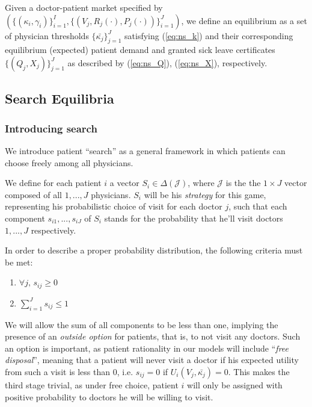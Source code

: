 \documentclass[../main.tex]{subfiles}
\begin{document}
\begin{equilibrium}
    \label{ns_eq}
Given a doctor-patient market specified by \\ $(\{(\kappa_i,\gamma_i)\}_{i =1}^{I},\{(V_j,R_j(\cdot),P_j(\cdot))\}_{i =1}^{J})$, we define an equilibrium as a set of physician thresholds $\{\bar{\kappa_j}\}_{j =1}^{J}$ satisfying (\ref{eq:ns_k}) and their corresponding equilibrium (expected) patient demand and granted sick leave certificates $\{(Q_j,X_j)\}_{j =1}^{J}$ as described by (\ref{eq:ns_Q}), (\ref{eq:ns_X}), respectively.
\end{equilibrium}

\subsection{Search Equilibria}

\subsubsection{Introducing search}

We introduce patient ``search'' as a general framework in which patients can choose freely among all physicians.

We define for each patient $i$ a vector $S_i \in \Delta(\mathcal{J})$, where $\mathcal{J}$ is the the $1 \times J$ vector composed of all $1, ..., J$ physicians. $S_i$ will be his \textit{strategy} for this game, representing his probabilistic choice of visit for each doctor $j$, such that each component $s_{i1}, ... , s_{iJ}$ of $S_i$ stands for the probability that he'll visit doctors $1, ..., J$ respectively.

In order to describe a proper probability distribution, the following criteria must be met:


\begin{enumerate}[label=\roman*.]
    \item $\forall j, \, s_{ij} \geq 0$
    \item $\sum_{i = 1}^{J} s_{ij} \leq 1$
\end{enumerate}

We will allow the sum of all components to be less than one, implying the presence of an \textit{outside option} for patients, that is, to not visit any doctors. Such an option is important, as patient rationality in our models will include  ``\textit{free disposal}'', meaning that a patient will never visit a doctor if his expected utility from such a visit is less than $0$, i.e. $s_{ij} = 0$ if $U_i(V_j,\bar{\kappa_j}) = 0$. This makes the third stage trivial, as under free choice, patient $i$ will only be assigned with positive probability to doctors he will be willing to visit.
\end{document}
